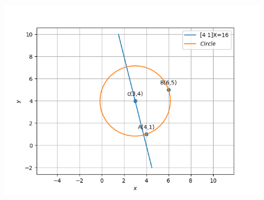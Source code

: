 \documentclass[12pt]{article}
\begin{document}
\begin{figure}[!h]
	\begin{center} 
	    \includegraphics[width=\columnwidth]{figs/circ2}
	\end{center}
\caption{}
\label{fig:Fig1}
\end{figure}
\end{document}
